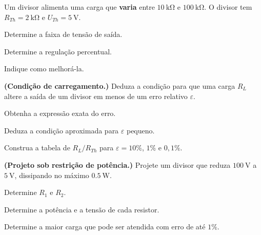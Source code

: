 \begin{questao}[3]{}

Um divisor alimenta uma carga que \textbf{varia} entre $\SI{10}{\kilo\ohm}$ e
$\SI{100}{\kilo\ohm}$. O divisor tem $R_{Th}=\SI{2}{\kilo\ohm}$ e
$U_{Th}=\SI{5}{\volt}$.
\begin{itensq}
\item Determine a faixa de tensão de saída.
\item Determine a regulação percentual.
\item Indique como melhorá-la.
\end{itensq}


\end{questao}

\blocodesafio
\begin{questao}[4]{}

\textbf{(Condição de carregamento.)} Deduza a condição para que uma carga
$R_L$ altere a saída de um divisor em menos de um erro relativo $\varepsilon$.
\begin{itensq}
\item Obtenha a expressão exata do erro.
\item Deduza a condição aproximada para $\varepsilon$ pequeno.
\item Construa a tabela de $R_L/R_{Th}$ para
      $\varepsilon=10\%$, $1\%$ e $0{,}1\%$.
\end{itensq}


\end{questao}
\begin{questao}[4]{}

\textbf{(Projeto sob restrição de potência.)} Projete um divisor que reduza
$\SI{100}{\volt}$ a $\SI{5}{\volt}$, dissipando no máximo
$\SI{0.5}{\watt}$.
\begin{itensq}
\item Determine $R_1$ e $R_2$.
\item Determine a potência e a tensão de cada resistor.
\item Determine a maior carga que pode ser atendida com erro de até $1\%$.
\end{itensq}


\end{questao}
